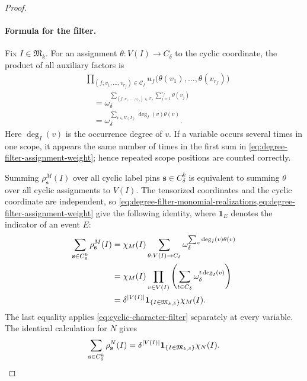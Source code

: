 \documentclass[11pt]{article}
\theoremstyle{plain}
\theoremstyle{definition}
\theoremstyle{remark}
\newcommand{\InstMonoid}[1]{\mathfrak M_{#1}}
\DeclarePairedDelimiter{\abs}{\lvert}{\rvert}
\begin{document}
\begin{proof}
\paragraph{Formula for the filter.}
Fix $I\in\InstMonoid{k}$.  For an assignment
$\theta:V(I)\to C_\delta$ to the cyclic coordinate, the product of all
auxiliary factors is
\begin{equation}
\begin{aligned}
  &\prod_{(f;v_1,\ldots,v_{r_f})\in\mathcal C_I}
    u_f\bigl(\theta(v_1),\ldots,\theta(v_{r_f})\bigr)\\
  &\quad={}
    \omega_\delta^{
      \sum_{(f;v_1,\ldots,v_{r_f})\in\mathcal C_I}
      \sum_{j=1}^{r_f}\theta(v_j)}\\
  &\quad={}
    \omega_\delta^{
      \sum_{v\in V(I)}\deg_I(v)\theta(v)}.
  \label{eq:degree-filter-assignment-weight}
\end{aligned}
\end{equation}
Here $\deg_I(v)$ is the occurrence degree of $v$.  If a variable occurs
several times in one scope, it appears the same number of times in the first
sum in \eqref{eq:degree-filter-assignment-weight}; hence repeated scope
positions are counted correctly.

Summing $\rho^M_{\mathbf s}(I)$ over all cyclic label pins
$\mathbf s\in C_\delta^k$ is equivalent to summing $\theta$ over all cyclic
assignments to $V(I)$.  The tensorized coordinates and the cyclic coordinate
are independent, so
\cref{eq:degree-filter-monomial-realizations,eq:degree-filter-assignment-weight}
give the following identity, where $\mathbf 1_E$ denotes the indicator of an event
$E$:
\begin{equation}
\begin{aligned}
  \sum_{\mathbf s\in C_\delta^k}\rho^M_{\mathbf s}(I)
  &=\chi_M(I)
    \sum_{\theta:V(I)\to C_\delta}
      \omega_\delta^{\sum_v\deg_I(v)\theta(v)}\\
  &=\chi_M(I)
    \prod_{v\in V(I)}
      \left(
        \sum_{t\in C_\delta}
          \omega_\delta^{t\deg_I(v)}
      \right)\\
  &=\delta^{\abs{V(I)}}
    \mathbf 1_{\{I\in\mathfrak M_{k,\delta}\}}
    \chi_M(I).
  \label{eq:degree-filter-H}
\end{aligned}
\end{equation}
The last equality applies \eqref{eq:cyclic-character-filter} separately at
every variable.  The identical calculation for $N$ gives
\begin{equation}
  \sum_{\mathbf s\in C_\delta^k}\rho^N_{\mathbf s}(I)
  =\delta^{\abs{V(I)}}
    \mathbf 1_{\{I\in\mathfrak M_{k,\delta}\}}
    \chi_N(I).
  \label{eq:degree-filter-G}
\end{equation}


\end{proof}
\end{document}
